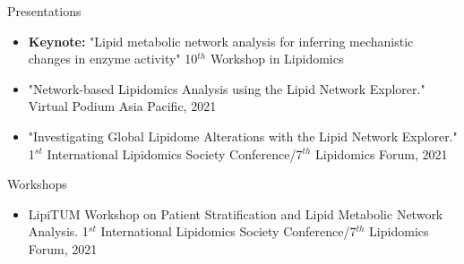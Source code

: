 
\datedsubsection{}
{%
}
{%
	Presentations
}
{%
	\begin{itemize}
		\item \textbf{Keynote:} "Lipid metabolic network analysis for inferring mechanistic changes in enzyme activity" 10$^{th}$ Workshop in Lipidomics
		\item "Network-based Lipidomics Analysis using the Lipid Network Explorer." Virtual Podium Asia Pacific, 2021
		\item "Investigating Global Lipidome Alterations with the Lipid Network Explorer." 1$^{st}$ International Lipidomics Society Conference/7$^{th}$ Lipidomics Forum, 2021
	\end{itemize}
}

\datedsubsection{}
{%
}
{%
	Workshops
}
{%
	\begin{itemize}
		\item LipiTUM Workshop on Patient Stratification and Lipid Metabolic Network Analysis. 1$^{st}$ International Lipidomics Society Conference/7$^{th}$ Lipidomics Forum, 2021
	\end{itemize}
}
